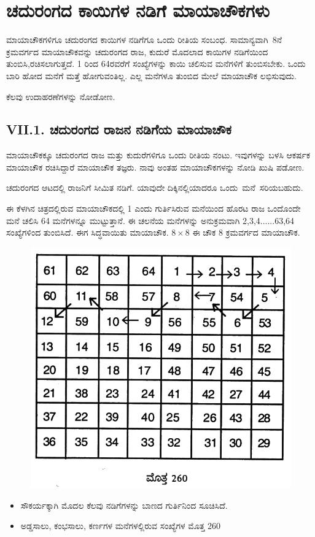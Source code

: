 \chapter{ಚದುರಂಗದ ಕಾಯಿಗಳ ನಡಿಗೆ ಮಾಯಾಚೌಕಗಳು}

ಮಾಯಾಚೌಕಗಳಿಗೂ ಚದುರಂಗದ ಕಾಯಿಗಳ ನಡಿಗೆಗೂ ಒಂದು ರೀತಿಯ ಸಂಬಂಧ. \hbox{ಸಾಮಾನ್ಯವಾಗಿ 8ನೆ} ಕ್ರಮವರ್ಗದ ಮಾಯಾಚೌಕವನ್ನು ಚದುರಂಗದ ರಾಜ, ಕುದುರೆ ಮೊದ\-ಲಾದ ಕಾಯಿಗಳ ನಡಿಗೆಯಿಂದ ತುಂಬಿಸಿ,ರಚಿಸಲಾಗುತ್ತದೆ. 1 ರಿಂದ 64ರವರೆಗೆ ಸಂಖ್ಯೆ\-ಗಳನ್ನು ಕಾಯಿ ಚಲಿಸುವ ಮನೆಗಳಿಗೆ ತುಂಬಿಸಬೇಕು. ಒಂದು ಬಾರಿ ಹೋದ ಮನೆಗೆ ಮತ್ತೆ ಹೋಗುವಂತಿಲ್ಲ. ಎಲ್ಲ ಮನೆಗಳೂ ತುಂಬಿದ ಮೇಲೆ ಮಾಯಾಚೌಕ ಲಭಿಸುವುದು.

ಕೆಲವು ಉದಾಹರಣೆಗಳನ್ನು ನೋಡೋಣ.

\section*{VII.1. ಚದುರಂಗದ ರಾಜನ ನಡಿಗೆಯ ಮಾಯಾಚೌಕ}

ಮಾಯಾಚೌಕಕ್ಕೂ ಚದುರಂಗದ ರಾಜ ಮತ್ತು ಕುದುರೆಗಳಿಗೂ ಒಂದು ರೀತಿಯ ನಂಟು. ಇವುಗಳನ್ನು ಬಳಸಿ ಆಕರ್ಷಕ ಮಾಯಾಚೌಕ ರಚಿಸಿದ್ದಾರೆ ಮಾಯಾಚೌಕ ತಜ್ಞರು. ನಾವು ಅಂತಹ ಮಾಯಾಚೌಕಗಳನ್ನು ನೋಡಿ ಖುಷಿ ಪಡೋಣ.

ಚದುರಂಗದ ಆಟದಲ್ಲಿ ರಾಜನಿಗೆ ಸೀಮಿತ ನಡಿಗೆ. ಯಾವುದೇ ದಿಕ್ಕಿನಲ್ಲಿಯಾದರೂ \hbox{ಒಂದು ಮನೆ ಸರಿಯಬಹುದು.}

ಈ ಕೆಳಗಿನ ಚಿತ್ರದಲ್ಲಿರುವ ಮಾಯಾಚೌಕದಲ್ಲಿ 1 ಎಂದು ಗುರ್ತಿಸಿರುವ ಮನೆಯಿಂದ ಹೊರಟ ರಾಜ ಒಂದೊಂದೇ ಮನೆ ಚಲಿಸಿ 64 ಮನೆಗಳನ್ನೂ ಮುಟ್ಟುತ್ತಾನೆ. ಈ ಚಲನೆಯ ಮನೆಗಳನ್ನು ಅನುಕ್ರಮವಾಗಿ 2,3,4......63,64 ಸಂಖ್ಯೆಗಳಿಂದ ತುಂಬಿಸಿದೆ. ಈಗ ಸಿದ್ಧ\-ವಾಯಿತು ಮಾಯಾಚೌಕ. $8 \times 8$ ಈ ಚೌಕ 8 ಕ್ರಮವರ್ಗದ ಮಾಯಾಚೌಕ.
\begin{figure}[H]
\includegraphics[scale=.8]{src/figures/chap6/fig6-1.jpg}
\end{figure}
\begin{itemize}
	\item ಸೌಕರ್ಯಕ್ಕಾಗಿ ಮೊದಲ ಕೆಲವು ನಡಿಗೆಗಳನ್ನು ಬಾಣದ ಗುರ್ತಿನಿಂದ ಸೂಚಿಸಿದೆ.
	\item ಅಡ್ಡಸಾಲು, ಕಂಭಸಾಲು, ಕರ್ಣಗಳ ಮನೆಗಳಲ್ಲಿರುವ ಸಂಖ್ಯೆಗಳ ಮೊತ್ತ 260
\end{itemize}

